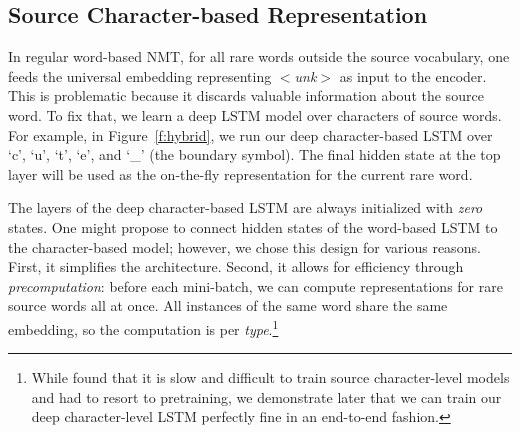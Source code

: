 \documentclass[11pt]{article}
\newcommand{\imgExt}{eps}
\newcommand{\word}[1]{``#1''}
\newcommand{\unk}{$<${\it unk}$>$}
\begin{document}
\subsection{Source Character-based Representation}
\label{subsec:src}
In regular word-based
NMT, for all rare words outside the source vocabulary, one feeds the
universal embedding representing \unk{} as input to the encoder. This is
problematic because it discards valuable information about the source word. To
fix that, we learn a deep LSTM model over characters
of source words. 
For example, in Figure~\ref{f:hybrid}, we run
our deep character-based LSTM over `c', `u', `t', `e', and `\_' (the boundary
symbol). The final hidden state at the top layer will be used as the on-the-fly
representation for the current rare word.

The layers of the deep character-based LSTM are always initialized with {\it
zero} states. One might propose to connect hidden
states of the word-based LSTM to the character-based model; however, we chose this design
for various reasons. First, it simplifies the architecture. Second, it allows
for efficiency through {\it precomputation}: before each mini-batch, we can compute
representations for rare source words all at once. All instances of the same
word share the same embedding, so the computation is per {\it type}.\footnote{While  found that it is slow and difficult to train
source character-level models and had to resort to pretraining, we demonstrate
later that we can train our deep character-level LSTM %
perfectly fine in an end-to-end fashion.} 


\end{document}
